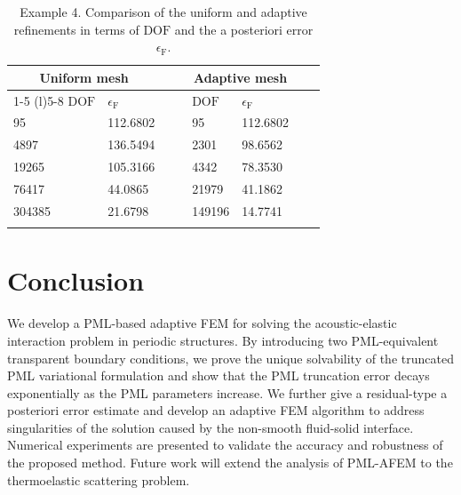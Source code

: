 \documentclass[final,3p,times]{elsarticle}
\begin{document}
\begin{table}[!htb]
	\centering
	\caption{Example 4. Comparison of the uniform and adaptive refinements in terms of $\mathrm{DOF}$ and the a posteriori error $\epsilon_\mathrm{F}$.}
	\begin{tabular*}{\textwidth}{@{\extracolsep\fill}llllllll@{\extracolsep\fill}}
		\toprule
		\multicolumn{2}{c}{Uniform mesh} & & &      \multicolumn{2}{c}{Adaptive mesh} \\
		\cmidrule(r){1-5} \cmidrule(l){5-8}
		$\mathrm{DOF}$ & \hspace{3em} $\epsilon_\mathrm{F}$  & & &  $\mathrm{DOF}$ & \hspace{3em}$\epsilon_\mathrm{F}$  \\
		\midrule
		95 & \hspace{1.8em}112.6802 &      & &   95 & \hspace{1.8em}112.6802 &  \\
		4897 & \hspace{1.8em}136.5494 &     & &   2301 & \hspace{1.8em}98.6562 &  \\
		19265 & \hspace{1.8em}105.3166 &   & &   4342 & \hspace{1.8em}78.3530 &  \\
		76417 & \hspace{1.8em}44.0865 &   & &   21979 & \hspace{1.8em}41.1862 &  \\
		304385 & \hspace{1.8em}21.6798 &  & &  149196 & \hspace{1.8em}14.7741 &  \\
		\bottomrule
		\label{Exam4_k20_table}
	\end{tabular*}
\end{table}

\section{Conclusion}\label{SECTION6}
We develop a PML-based adaptive FEM for solving the acoustic-elastic interaction problem in periodic structures. 
By introducing two PML-equivalent transparent boundary conditions, we prove the unique solvability of the truncated PML variational formulation and show that the PML truncation error decays exponentially as the PML parameters increase. We further give a residual-type a posteriori error estimate and develop an adaptive FEM algorithm to address singularities of the solution caused by the non-smooth fluid-solid interface. Numerical experiments are presented to validate the accuracy and robustness of the proposed method. Future work will extend the analysis of PML-AFEM to the thermoelastic scattering problem.
\end{document}
